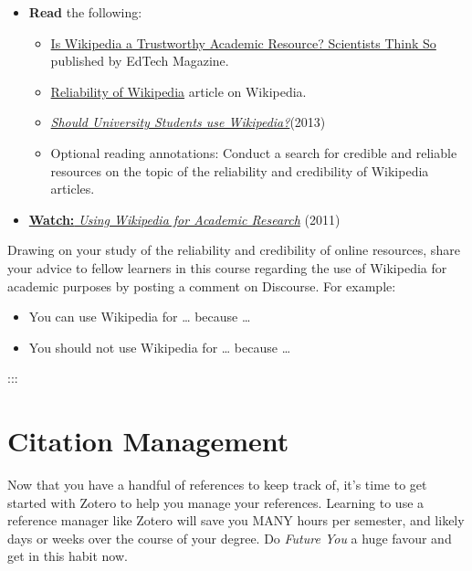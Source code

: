 \documentclass[
  letterpaper,
  DIV=11,
  numbers=noendperiod]{scrreprt}
\providecommand{\tightlist}{%
  \setlength{\itemsep}{0pt}\setlength{\parskip}{0pt}}\usepackage{longtable,booktabs,array}
\begin{document}
\begin{itemize}
\tightlist
\item
  \textbf{Read} the following:

  \begin{itemize}
  \tightlist
  \item
    \href{https://edtechmagazine.com/higher/article/2017/12/wikipedia-trustworthy-academic-resource-scientists-think-so}{Is
    Wikipedia a Trustworthy Academic Resource? Scientists Think So}
    published by EdTech Magazine.
  \item
    \href{https://en.wikipedia.org/wiki/Reliability_of_Wikipedia}{Reliability
    of Wikipedia} article on Wikipedia.
  \item
    \href{https://www.theguardian.com/education/2013/may/13/should-university-students-use-wikipedia}{\emph{Should
    University Students use Wikipedia?}}(2013)
  \item
    Optional reading annotations: Conduct a search for credible and
    reliable resources on the topic of the reliability and credibility
    of Wikipedia articles.
  \end{itemize}
\item
  \href{https://www.youtube-nocookie.com/embed/Cql_yVUYj6A}{\textbf{Watch:}
  \emph{Using Wikipedia for Academic Research}} (2011)
\end{itemize}

Drawing on your study of the reliability and credibility of online
resources, share your advice to fellow learners in this course regarding
the use of Wikipedia for academic purposes by posting a comment on
Discourse. For example:

\begin{itemize}
\tightlist
\item
  You can use Wikipedia for \ldots{} because \ldots{}
\item
  You should not use Wikipedia for \ldots{} because \ldots{}
\end{itemize}

:::

\section{Citation Management}\label{citation-management}

Now that you have a handful of references to keep track of, it's time to
get started with Zotero to help you manage your references. Learning to
use a reference manager like Zotero will save you MANY hours per
semester, and likely days or weeks over the course of your degree. Do
\emph{Future You} a huge favour and get in this habit now.
\end{document}
